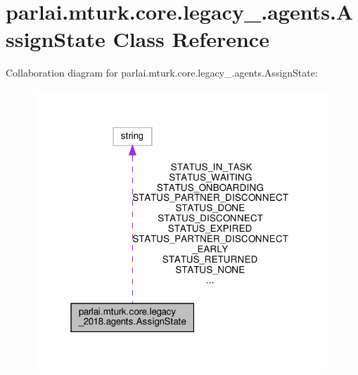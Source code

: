\hypertarget{classparlai_1_1mturk_1_1core_1_1legacy__2018_1_1agents_1_1AssignState}{}\section{parlai.\+mturk.\+core.\+legacy\+\_.\+agents.\+Assign\+State Class Reference}
\label{classparlai_1_1mturk_1_1core_1_1legacy__2018_1_1agents_1_1AssignState}


Collaboration diagram for parlai.\+mturk.\+core.\+legacy\+\_.\+agents.\+Assign\+State\+:
\nopagebreak
\begin{figure}[H]
\begin{center}
\leavevmode
\includegraphics[width=313pt]{classparlai_1_1mturk_1_1core_1_1legacy__2018_1_1agents_1_1AssignState__coll__graph}
\end{center}
\end{figure}
